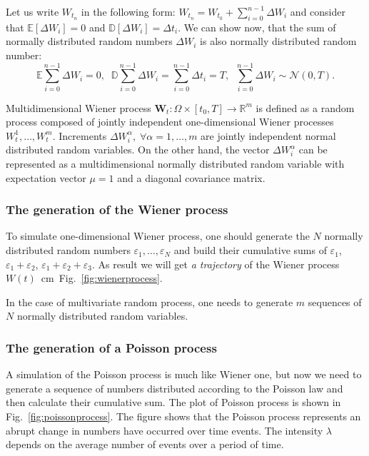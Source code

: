 \documentclass[%
floatfix,
showkeys,
nofootinbib, %
superscriptaddress, %
]{revtex4-1}
\begin{document}
Let us write $W_{t_{n}}$ in the following form:
$
        W_{t_{n}} = W_{t_{0}} + \sum\limits_{i=0}^{n-1}\Delta W_{i} 
$
and consider that $\mathbb{E}[\Delta W_{i}] = 0$ and $\mathbb{D}[\Delta W_{i}] = \Delta t_{i}$. We can show now, that the sum of normally distributed random numbers $\Delta W_{i}$ is also normally distributed random number:
\[
        \mathbb{E}\sum\limits_{i=0}^{n-1}\Delta W_{i} = 0, \;\; \mathbb{D}\sum\limits_{i=0}^{n-1}\Delta W_{i} = \sum\limits_{i=0}^{n-1} \Delta t_{i} = T,\;\; \sum\limits_{i=0}^{n-1}\Delta W_{i} \sim \mathcal{N}(0,T).
\]

Multidimensional Wiener process
$\mathbf{W}_{t}\colon \Omega\times[t_{0},T]\to \mathbb{R}^{m}$ is
defined as a random process composed of jointly independent
one-dimensional Wiener processes $W^{1}_t,\ldots,W^{m}_t$. Increments
$\Delta W^{\alpha}_{i},\;\forall \alpha = 1,\ldots,m$ are jointly
independent normal distributed random variables. On the other hand,
the vector $\Delta W^{\alpha}_{i}$ can be represented as a
multidimensional normally distributed random variable with expectation
vector $\mu = 1$ and a diagonal covariance matrix.

\subsubsection{The generation of the Wiener process}

To simulate one-dimensional Wiener process, one should generate the
$N$ normally distributed random numbers
$\varepsilon_{1}, \ldots, \varepsilon_{N}$ and build their cumulative
sums of $\varepsilon_{1}$, $\varepsilon_{1} + \varepsilon_{2}$,
$\varepsilon_{1} + \varepsilon_{2} + \varepsilon_{3}$. As result we
will get \emph{a trajectory} of the Wiener process
$W(t)$~cm~Fig.~\ref{fig:wienerprocess}.

In the case of multivariate random process, one needs to generate $m$ sequences of $N$ normally distributed random variables.

\subsubsection{The generation of a Poisson process}

A simulation of the Poisson process is much like Wiener one, but now
we need to generate a sequence of numbers distributed according to the
Poisson law and then calculate their cumulative sum. The plot of
Poisson process is shown in Fig.~\ref{fig:poissonprocess}. The figure
shows that the Poisson process represents an abrupt change in numbers
have occurred over time events. The intensity $\lambda$ depends on the
average number of events over a period of time.
\end{document}
